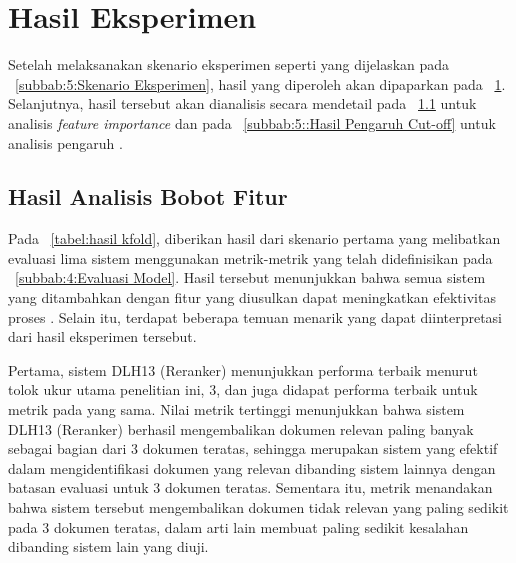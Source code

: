 \section{Hasil Eksperimen}
\label{subbab:5:Hasil Eksperimen}
Setelah melaksanakan skenario eksperimen seperti yang dijelaskan pada \subbab{}~\ref{subbab:5:Skenario Eksperimen}, hasil yang diperoleh akan dipaparkan pada \subbab{}~\ref{subbab:5:Hasil Eksperimen}. Selanjutnya, hasil tersebut akan dianalisis secara mendetail pada \subbab{}~\ref{subbab:5::Hasil Analisis Bobot Fitur} untuk analisis \textit{feature importance} dan pada \subbab{}~\ref{subbab:5::Hasil Pengaruh Cut-off} untuk analisis pengaruh \cutoff{}.





\subsection{Hasil Analisis Bobot Fitur}
\label{subbab:5::Hasil Analisis Bobot Fitur}
Pada \tabel{}~\ref{tabel:hasil kfold}, diberikan hasil dari skenario pertama yang melibatkan evaluasi lima sistem \cascaded{} \ir{} menggunakan metrik-metrik yang telah didefinisikan pada \subbab{}~\ref{subbab:4:Evaluasi Model}. Hasil tersebut menunjukkan bahwa semua sistem \ir{} yang ditambahkan \reranker{} dengan fitur yang diusulkan dapat meningkatkan efektivitas proses \retrieval{}. Selain itu, terdapat beberapa temuan menarik yang dapat diinterpretasi dari hasil eksperimen tersebut.

Pertama, sistem DLH13 (Reranker) menunjukkan performa terbaik menurut tolok ukur utama penelitian ini, \recall{} \cutoff{} 3, dan juga didapat performa terbaik untuk metrik \precision{} pada \cutoff{} yang sama. Nilai metrik \recall{} tertinggi menunjukkan bahwa sistem DLH13 (Reranker) berhasil mengembalikan dokumen relevan paling banyak sebagai bagian dari 3 dokumen teratas, sehingga merupakan sistem yang efektif dalam mengidentifikasi dokumen yang relevan dibanding sistem lainnya dengan batasan evaluasi untuk 3 dokumen teratas. Sementara itu, metrik \precision{} menandakan bahwa sistem tersebut mengembalikan dokumen tidak relevan yang paling sedikit pada 3 dokumen teratas, dalam arti lain membuat paling sedikit kesalahan dibanding sistem lain yang diuji.

